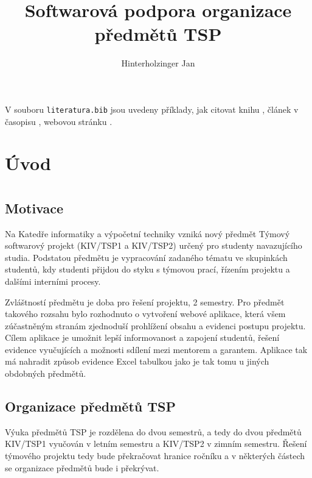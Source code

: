 \documentclass[czech,BP]{thesiskiv}
\author{Hinterholzinger Jan}
\title{Softwarová podpora organizace předmětů TSP}
\begin{document}
%
\maketitle
\tableofcontents

V souboru \texttt{literatura.bib} jsou uvedeny příklady, jak citovat knihu \cite{KnuthAOCP2}, článek v časopisu \cite{Hoare1961}, webovou stránku \cite{Graphics2D}.
\chapter{Úvod}
\chapter{}
\section{Motivace}
	\par Na Katedře informatiky a výpočetní techniky vzniká nový předmět Týmový softwarový projekt (KIV/TSP1 a KIV/TSP2) určený pro studenty navazujícího studia. Podstatou předmětu je vypracování zadaného tématu ve skupinkách studentů, kdy studenti přijdou do styku s týmovou prací, řízením projektu a dalšími interními procesy.
	\par Zvláštností předmětu je doba pro řešení projektu, 2 semestry. Pro předmět takového rozsahu bylo rozhodnuto o vytvoření webové aplikace, která všem zúčastněným stranám zjednoduší prohlížení obsahu a evidenci postupu projektu. Cílem aplikace je umožnit lepší informovanost a zapojení studentů, řešení evidence vyučujících a možnosti sdílení mezi mentorem a garantem. Aplikace tak má nahradit způsob evidence Excel tabulkou jako je tak tomu u jiných obdobných předmětů.
\section{Organizace předmětů TSP}
	\par Výuka předmětů TSP je rozdělena do dvou semestrů, a tedy do dvou předmětů KIV/TSP1 vyučován v letním semestru a KIV/TSP2 v zimním semestru. Řešení týmového projektu tedy bude překračovat hranice ročníku a v některých částech se organizace předmětů bude i překrývat.
\end{document}
